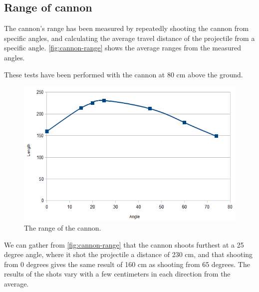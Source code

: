 \subsection{Range of cannon}
The cannon's range has been measured by repeatedly shooting the cannon from specific angles, and calculating the average travel distance of the projectile from a specific angle. \autoref{fig:cannon-range} shows the average ranges from the measured angles.

These tests have been performed with the cannon at 80 cm above the ground.

\begin{figure}[hbtp]
\includegraphics[width=\textwidth]{img/cannon-range.png}
\caption{The range of the cannon.} 
\label{fig:cannon-range} 
\end{figure}

We can gather from \autoref{fig:cannon-range} that the cannon shoots furthest at a 25 degree angle, where it shot the projectile a distance of 230 cm, and that shooting from 0 degrees gives the same result of 160 cm as shooting from 65 degrees. The results of the shots vary with a few centimeters in each direction from the average.



